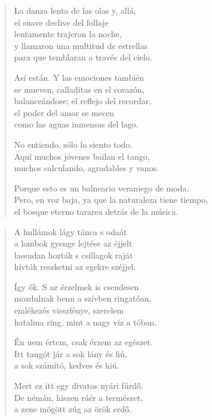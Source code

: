 \documentclass[11pt]{extbook}
\newcommand*{\centeredornament}{\centerline{\pgfornament[width=6cm]{88}}}
\begin{document}
\begin{verse}
  La danza lenta de las olas y, allá, \\
  el suave declive del follaje \\
  lentamente trajeron la noche, \\
  y llamaron una multitud de estrellas \\
  para que temblaran a través del cielo.

  Así están. Y las emociones también \\
  se mueven, calladitas en el corazón, \\
  balanceándose; el reflejo del recordar, \\
  el poder del amor se mecen \\
  como las aguas inmensas del lago.

  No entiendo, sólo lo siento todo. \\
  Aquí muchos jóvenes bailan el tango, \\
  muchos calculando, agradables y vanos.

  Porque esto es un balneario veraniego de moda.\hspace*{-1mm} \\
  Pero, en voz baja, ya que la naturaleza tiene tiempo, \\
  el bosque eterno tararea detrás de la música.
\end{verse}

\newpage

\vspace*{-15mm}
\centeredornament



\begin{verse}
  A hullámok lágy tánca s odaát \\
  a lombok gyenge lejtése az éjjelt \\
  lassudan hozták s csillagok raját \\
  hívták reszketni az egekre széjjel.

  Így ők. S az érzelmek is csendesen \\
  mozdulnak benn a szívben ringatóan, \\
  emlékezés visszfénye, szerelem \\
  hatalma ring, mint a nagy víz a tóban.

  Én nem értem, csak érzem az egészet. \\
  Itt tangót jár a sok lány és fiú, \\
  a sok számító, kedves és hiú.

  Mert ez itt egy divatos nyári fürdő. \\
  De némán, hiszen ráér a természet, \\
  a zene mögött zúg az örök erdő.
\end{verse}
\end{document}
